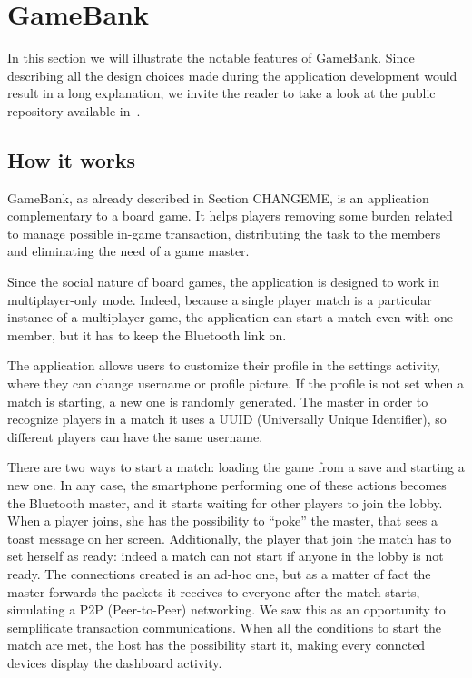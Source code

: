 \section{GameBank}

In this section we will illustrate the notable features of GameBank. Since 
describing all the design choices made during the application development would 
result in a long explanation, we invite the reader to take a look at the public 
repository available in~\cite{gamebank18}.

\subsection{How it works}

GameBank, as already described in Section CHANGEME,  is an application complementary to a board game. It helps players 
removing some burden related to manage possible in-game transaction, 
distributing the task to the members and eliminating the need of a game master.

Since the social nature of board games, the application is designed to work 
in multiplayer-only mode. Indeed, because a single player match is a particular 
instance of a multiplayer game, the application can start a match even with one 
member, but it has to keep the Bluetooth link on.

The application allows users to customize their profile in the settings 
activity, where they can change username or profile picture. If the profile is 
not set when a match is starting, a new one is randomly generated. The master 
in order to recognize players in a match it uses a UUID (Universally Unique 
Identifier), so different players can have the same username.

There are two ways to start a match: loading the game from a save and starting 
a new one. In any case, the smartphone performing one of these actions becomes 
the Bluetooth master, and it starts waiting for other players to join the 
lobby. When a player joins, she has the possibility to ``poke'' the master, 
that sees a toast message on her screen. Additionally, the player that join the 
match has to set herself as ready: indeed a match can not start if anyone in the 
lobby is not ready. 
The connections created is an ad-hoc one, but as a matter of fact the master 
forwards the packets it receives to everyone after the match starts, simulating 
a P2P (Peer-to-Peer) networking. We saw this as an opportunity to semplificate 
transaction communications.
When all the conditions to start the match are met, the host has the 
possibility start it, making every conncted devices display the dashboard 
activity.


